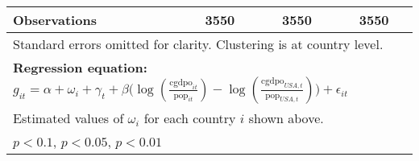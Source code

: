 \begin{table}[htbp]
\begin{tabular}{l*{3}{c}}
\midrule
Observations    &     3550         &     3550         &     3550         \\
\bottomrule
\multicolumn{4}{l}{\footnotesize Standard errors omitted for clarity. Clustering is at country level.}\\
\multicolumn{4}{l}{\footnotesize \textbf{Regression equation:} \(g_{it} = \alpha  + \omega_i + \gamma_t + \beta \big(\log (\frac{\textrm{cgdpo}_{it}}{\textrm{pop}_{it}} ) - \log (\frac{\textrm{cgdpo}_{USA,t}}{\textrm{pop}_{USA,t}}  ) \big) + \epsilon_{it}\)}\\
\multicolumn{4}{l}{\footnotesize Estimated values of \(\omega_i\) for each country \(i\) shown above.}\\
\multicolumn{4}{l}{\footnotesize \sym{*} \(p<0.1\), \sym{**} \(p<0.05\), \sym{***} \(p<0.01\)}\\
\end{tabular}
\end{table}
